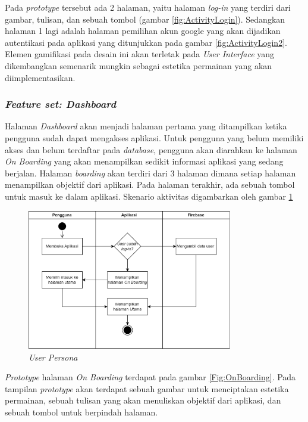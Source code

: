 Pada \textit{prototype} tersebut ada 2 halaman, yaitu halaman \textit{log-in} yang terdiri dari gambar, tulisan, dan sebuah tombol (gambar \ref*{fig:ActivityLogin}).
Sedangkan halaman 1 lagi adalah halaman pemilihan akun google yang akan dijadikan autentikasi pada aplikasi yang ditunjukkan pada gambar \ref*{fig:ActivityLogin2}.
Elemen gamifikasi pada desain ini akan terletak pada \textit{User Interface} yang dikembangkan semenarik mungkin sebagai estetika permainan yang akan diimplementasikan. 

\subsubsection{\textit{Feature set: Dashboard}}
Halaman \textit{Dashboard} akan menjadi halaman pertama yang ditampilkan ketika pengguna sudah dapat mengakses aplikasi.
Untuk pengguna yang belum memiliki akses dan belum terdaftar pada \textit{database}, pengguna akan diarahkan ke halaman \textit{On Boarding} yang akan menampilkan sedikit informasi aplikasi yang sedang berjalan.
Halaman \textit{boarding} akan terdiri dari 3 halaman dimana setiap halaman menampilkan objektif dari aplikasi.
Pada halaman terakhir, ada sebuah tombol untuk masuk ke dalam aplikasi. Skenario aktivitas digambarkan oleh gambar \ref*{Fig:ActivityMain}
\begin{figure}[H]
	\centering
	\includegraphics[width=0.8\textwidth]{contents/chapter-3/images/AD-halamanutama.png}
	\caption{\textit{User Persona}}
	\label{Fig:ActivityMain}
\end{figure}
\textit{Prototype} halaman \textit{On Boarding} terdapat pada gambar \ref*{Fig:OnBoarding}. Pada tampilan \textit{prototype} akan terdapat sebuah gambar untuk menciptakan estetika permainan,
sebuah tulisan yang akan menuliskan objektif dari aplikasi, dan sebuah tombol untuk berpindah halaman.

